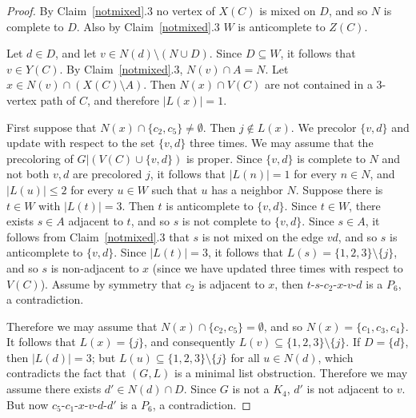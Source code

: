 \documentclass[11pt]{article}
\begin{document}
\begin{proof}
By Claim~\ref{notmixed}.3 no vertex of $X(C)$ is mixed on $D$, and so $N$ is complete  to $D$. Also by Claim~\ref{notmixed}.3 $W$ is anticomplete to $Z(C)$.

Let $d \in D$, and let $v \in N(d) \setminus (N \cup D)$. Since $D \subseteq W$, it follows that $v \in Y(C)$. By Claim~\ref{notmixed}.3, $N(v) \cap A=N$.  Let $x \in N(v) \cap (X(C) \setminus A)$. Then 
$N(x)\cap V(C)$ are not contained in a $3$-vertex 
path of $C$, and therefore  $|L(x)|=1$. 

First suppose that   $N(x)\cap \{c_2,c_5\}\neq \emptyset$. Then 
$j \not \in L(x)$.  We precolor $\{v,d\}$ and update with respect to the set 
$\{v,d\}$ three times. We may assume that the precoloring of $G|(V(C) \cup \{v,d\})$ is proper.
Since $\{v,d\}$ is complete to $N$ and not both $v,d$
are precolored $j$, it follows that $|L(n)|=1$ for every $n \in N$, and 
$|L(u)| \leq 2$ for every $u \in W$ such that $u$ has a neighbor $N$.
Suppose there is  $t \in W$ with 
$|L(t)|=3$. Then $t$ is anticomplete to $\{v,d\}$.  
Since $t \in W$, there exists $s \in A$ adjacent to $t$, and so 
$s$ is not complete to $\{v,d\}$.  Since $s \in A$, it 
follows from Claim~\ref{notmixed}.3 that $s$ is not mixed on the edge $vd$, and so $s$ is 
anticomplete to $\{v,d\}$. Since $|L(t)|=3$, it  follows that 
$L(s)=\{1,2,3\} \setminus \{j\}$, and so $s$ is non-adjacent
to $x$ (since we have updated three times with respect to $V(C)$).
Assume by symmetry that $c_2$ is adjacent to $x$, then $t$-$s$-$c_2$-$x$-$v$-$d$ is a
$P_6$, a contradiction. 

Therefore we may assume that  $N(x) \cap \{c_2,c_5\}= \emptyset$, and so
$N(x)=\{c_1,c_3,c_4\}$. It follows that $L(x)=\{j\}$, and consequently 
$L(v)\subseteq \{1,2,3\}\setminus \{j\}$. 
If $D=\{d\}$, then $|L(d)|=3$;
but $L(u)\subseteq \{1,2,3\}\setminus \{j\}$ for all $u\in N(d)$, which contradicts the fact that $(G,L)$ is a minimal list obstruction.
Therefore we may assume there exists $d'\in N(d)\cap D$. 
Since $G$ is not a $K_4$, $d'$ is not adjacent to $v$. 
But now $c_5$-$c_1$-$x$-$v$-$d$-$d'$ is a $P_6$, a contradiction.
\end{proof}
\end{document}
